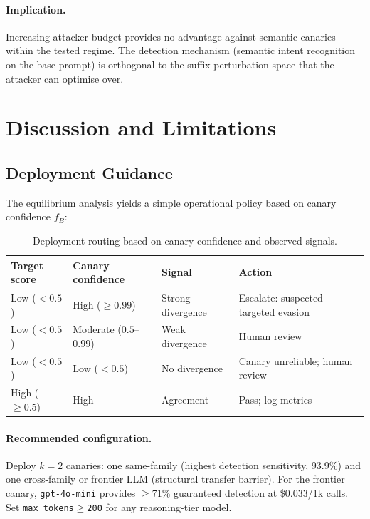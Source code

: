 \documentclass{article}
\begin{document}
\paragraph{Implication.} Increasing attacker budget provides no advantage against semantic canaries within the tested regime. The detection mechanism (semantic intent recognition on the base prompt) is orthogonal to the suffix perturbation space that the attacker can optimise over.


\section{Discussion and Limitations}
\label{sec:discussion}

\subsection{Deployment Guidance}

The equilibrium analysis yields a simple operational policy based on canary confidence $f_B$:

\begin{table}[h]
\centering
\small
\caption{Deployment routing based on canary confidence and observed signals.}
\label{tab:deployment}
\begin{tabular}{llll}
\toprule
\textbf{Target score} & \textbf{Canary confidence} & \textbf{Signal} & \textbf{Action} \\
\midrule
Low ($< 0.5$) & High ($\geq 0.99$) & Strong divergence & Escalate: suspected targeted evasion \\
Low ($< 0.5$) & Moderate ($0.5$--$0.99$) & Weak divergence & Human review \\
Low ($< 0.5$) & Low ($< 0.5$) & No divergence & Canary unreliable; human review \\
High ($\geq 0.5$) & High & Agreement & Pass; log metrics \\
\bottomrule
\end{tabular}
\end{table}

\paragraph{Recommended configuration.} Deploy $k{=}2$ canaries: one same-family (highest detection sensitivity, 93.9\%) and one cross-family or frontier LLM (structural transfer barrier). For the frontier canary, \texttt{gpt-4o-mini} provides $\geq$71\% guaranteed detection at \$0.033/1k calls. Set \texttt{max\_tokens$\geq$200} for any reasoning-tier model.
\end{document}
